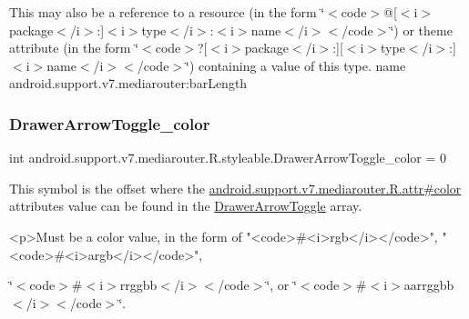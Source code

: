 This may also be a reference to a resource (in the form \char`\"{}$<$code$>$@\mbox{[}$<$i$>$package$<$/i$>$\+:\mbox{]}$<$i$>$type$<$/i$>$\+:$<$i$>$name$<$/i$>$$<$/code$>$\char`\"{}) or theme attribute (in the form \char`\"{}$<$code$>$?\mbox{[}$<$i$>$package$<$/i$>$\+:\mbox{]}\mbox{[}$<$i$>$type$<$/i$>$\+:\mbox{]}$<$i$>$name$<$/i$>$$<$/code$>$\char`\"{}) containing a value of this type.  name android.\+support.\+v7.\+mediarouter\+:bar\+Length \mbox{\label{classandroid_1_1support_1_1v7_1_1mediarouter_1_1R_1_1styleable_a8bd8d9885033bad0fe40599a324d5680}} 
\subsubsection{\texorpdfstring{Drawer\+Arrow\+Toggle\+\_\+color}{DrawerArrowToggle\_color}}
{\footnotesize\ttfamily int android.\+support.\+v7.\+mediarouter.\+R.\+styleable.\+Drawer\+Arrow\+Toggle\+\_\+color = 0\hspace{0.3cm}{\ttfamily [static]}}

This symbol is the offset where the \hyperlink{classandroid_1_1support_1_1v7_1_1mediarouter_1_1R_1_1attr_a4bb03a327a2223476d43ef921e0826a6}{android.\+support.\+v7.\+mediarouter.\+R.\+attr\#color} attribute\textquotesingle{}s value can be found in the \hyperlink{classandroid_1_1support_1_1v7_1_1mediarouter_1_1R_1_1styleable_a71030bdd9f81aafe32f56767ba04e5b0}{Drawer\+Arrow\+Toggle} array.

\begin{DoxyVerb}      <p>Must be a color value, in the form of "<code>#<i>rgb</i></code>", "<code>#<i>argb</i></code>",
\end{DoxyVerb}
 \char`\"{}$<$code$>$\#$<$i$>$rrggbb$<$/i$>$$<$/code$>$\char`\"{}, or \char`\"{}$<$code$>$\#$<$i$>$aarrggbb$<$/i$>$$<$/code$>$\char`\"{}. 

